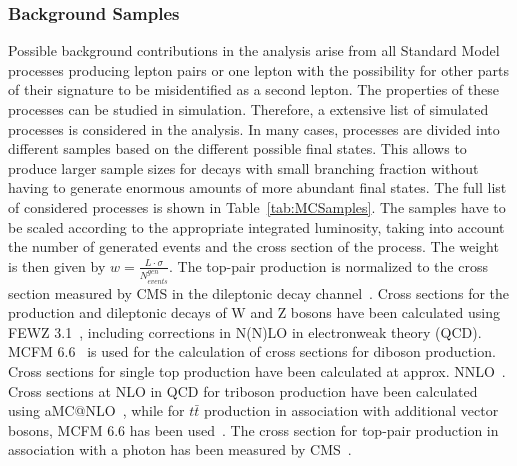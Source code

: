 \subsubsection{Background Samples}
Possible background contributions in the analysis arise from all Standard Model processes producing lepton pairs or one lepton with the possibility for other parts of their signature to be misidentified as a second lepton. The properties of these processes can be studied in simulation. Therefore, a extensive list of simulated processes is considered in the analysis. In many cases, processes are divided into different samples based on the different possible final states. This allows to produce larger sample sizes for decays with small branching fraction without having to generate enormous amounts of more abundant final states. The full list of considered processes is shown in Table~\ref{tab:MCSamples}. The samples have to be scaled according to the appropriate integrated luminosity, taking into account the number of generated events and the cross section of the process. The weight is then given by $w  = \frac{L\cdot \sigma}{N_{events}^{gen}}$. The top-pair production is normalized to the cross section measured by CMS in the dileptonic decay channel~\cite{ttXsec}. Cross sections for the production and dileptonic decays of W and Z bosons have been calculated using FEWZ 3.1~\cite{Li:2012wna}, including corrections in N(N)LO in electronweak theory (QCD). MCFM 6.6~\cite{Campbell:2011bn} is used for the calculation of cross sections for diboson production. Cross sections for single top production have been calculated at approx. NNLO~\cite{Kidonakis:2012db}. Cross sections at NLO in QCD for triboson production have been calculated using aMC@NLO~\cite{Madgraph2}, while for $t\bar{t}$ production in association with additional vector bosons, MCFM 6.6 has been used~\cite{Garzelli:2012bn}. The cross section for top-pair production in association with a photon has been measured by CMS~\cite{CMS-PAS-TOP-13-011}.  
